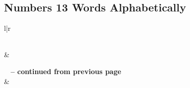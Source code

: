 

\subsection{Numbers 13 Words Alphabetically}


\normalsize
 
\begin{center}
\begin{longtable}{l|r}
\caption[Numbers 13 Words Alphabetically]{Numbers 13 Words Alphabetically}\label{table:WordsAlphabetically for Numbers 13} \\
\hline {} &  \\ \hline 
\endfirsthead
 
{{\bfseries \tablename\ \thetable{} -- continued from previous page}} \\  
\hline {} &  \\ \hline 
\endhead
 

\end{longtable}
\end{center}
